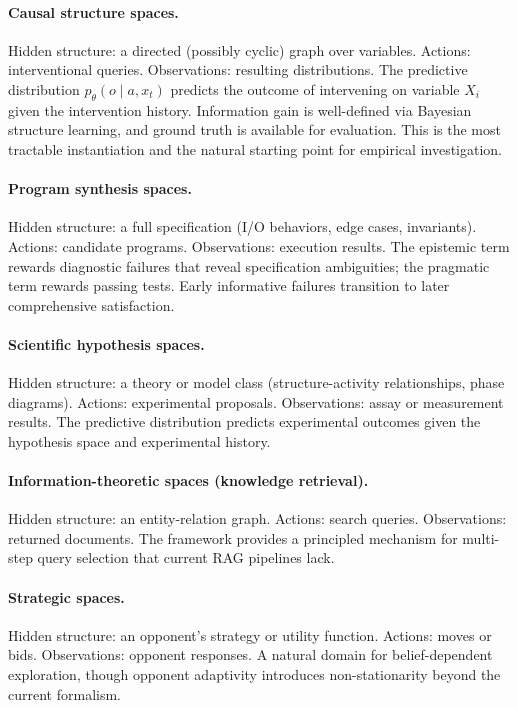 \documentclass[11pt]{article}
\begin{document}
\paragraph{Causal structure spaces.}
Hidden structure: a directed (possibly cyclic) graph over variables. Actions: interventional queries. Observations: resulting distributions. The predictive distribution $p_\theta(o \mid a, x_t)$ predicts the outcome of intervening on variable $X_i$ given the intervention history. Information gain is well-defined via Bayesian structure learning, and ground truth is available for evaluation. This is the most tractable instantiation and the natural starting point for empirical investigation.

\paragraph{Program synthesis spaces.}
Hidden structure: a full specification (I/O behaviors, edge cases, invariants). Actions: candidate programs. Observations: execution results. The epistemic term rewards diagnostic failures that reveal specification ambiguities; the pragmatic term rewards passing tests. Early informative failures transition to later comprehensive satisfaction.

\paragraph{Scientific hypothesis spaces.}
Hidden structure: a theory or model class (structure-activity relationships, phase diagrams). Actions: experimental proposals. Observations: assay or measurement results. The predictive distribution predicts experimental outcomes given the hypothesis space and experimental history.

\paragraph{Information-theoretic spaces (knowledge retrieval).}
Hidden structure: an entity-relation graph. Actions: search queries. Observations: returned documents. The framework provides a principled mechanism for multi-step query selection that current RAG pipelines lack.

\paragraph{Strategic spaces.}
Hidden structure: an opponent's strategy or utility function. Actions: moves or bids. Observations: opponent responses. A natural domain for belief-dependent exploration, though opponent adaptivity introduces non-stationarity beyond the current formalism.
\end{document}
